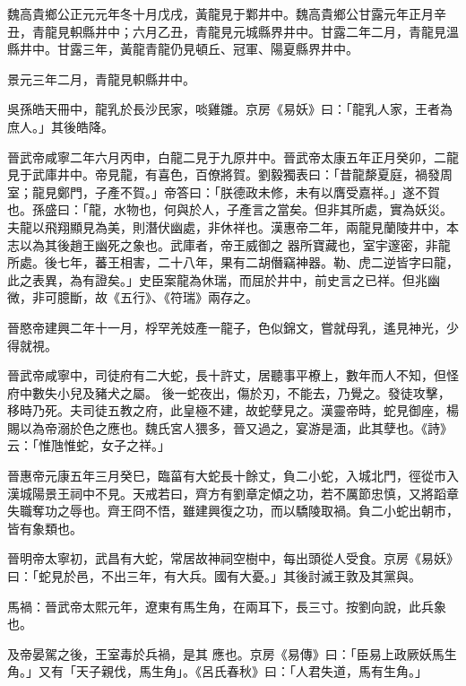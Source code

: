 \begin{pinyinscope}
 魏高貴鄉公正元元年冬十月戊戌，黃龍見于鄴井中。魏高貴鄉公甘露元年正月辛丑，青龍見軹縣井中；六月乙丑，青龍見元城縣界井中。甘露二年二月，青龍見溫縣井中。甘露三年，黃龍青龍仍見頓丘、冠軍、陽夏縣界井中。



 景元三年二月，青龍見軹縣井中。



 吳孫皓天冊中，龍乳於長沙民家，啖雞雛。京房《易妖》曰：「龍乳人家，王者為庶人。」其後皓降。



 晉武帝咸寧二年六月丙申，白龍二見于九原井中。晉武帝太康五年正月癸卯，二龍見于武庫井中。帝見龍，有喜色，百僚將賀。劉毅獨表曰：「昔龍漦夏庭，禍發周室；龍見鄭門，子產不賀。」帝答曰：「朕德政未修，未有以膺受嘉祥。」遂不賀也。孫盛曰：「龍，水物也，何與於人，子產言之當矣。但非其所處，實為妖災。夫龍以飛翔顯見為美，則潛伏幽處，非休祥也。漢惠帝二年，兩龍見蘭陵井中，本志以為其後趙王幽死之象也。武庫者，帝王威御之
 器所寶藏也，室宇邃密，非龍所處。後七年，蕃王相害，二十八年，果有二胡僭竊神器。勒、虎二逆皆字曰龍，此之表異，為有證矣。」史臣案龍為休瑞，而屈於井中，前史言之已祥。但兆幽微，非可臆斷，故《五行》、《符瑞》兩存之。



 晉愍帝建興二年十一月，桴罕羌妓產一龍子，色似錦文，嘗就母乳，遙見神光，少得就視。



 晉武帝咸寧中，司徒府有二大蛇，長十許丈，居聽事平橑上，數年而人不知，但怪府中數失小兒及豬犬之屬。
 後一蛇夜出，傷於刃，不能去，乃覺之。發徒攻擊，移時乃死。夫司徒五教之府，此皇極不建，故蛇孽見之。漢靈帝時，蛇見御座，楊賜以為帝溺於色之應也。魏氏宮人猥多，晉又過之，宴游是湎，此其孽也。《詩》云：「惟虺惟蛇，女子之祥。」



 晉惠帝元康五年三月癸巳，臨菑有大蛇長十餘丈，負二小蛇，入城北門，徑從市入漢城陽景王祠中不見。天戒若曰，齊方有劉章定傾之功，若不厲節忠慎，又將蹈章
 失職奪功之辱也。齊王冏不悟，雖建興復之功，而以驕陵取禍。負二小蛇出朝市，皆有象類也。



 晉明帝太寧初，武昌有大蛇，常居故神祠空樹中，每出頭從人受食。京房《易妖》曰：「蛇見於邑，不出三年，有大兵。國有大憂。」其後討滅王敦及其黨與。



 馬禍：晉武帝太熙元年，遼東有馬生角，在兩耳下，長三寸。按劉向說，此兵象也。



 及帝晏駕之後，王室毒於兵禍，是其
 應也。京房《易傳》曰：「臣易上政厥妖馬生角。」又有「天子親伐，馬生角」。《呂氏春秋》曰：「人君失道，馬有生角。」




\end{pinyinscope}
